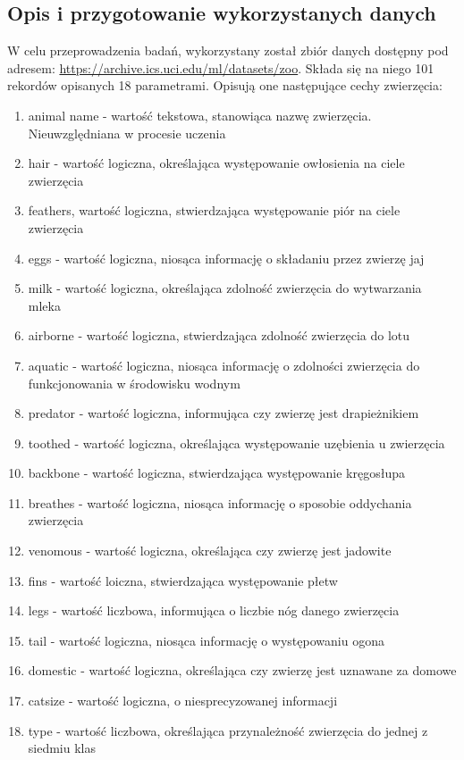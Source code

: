\documentclass[12pt,twoside]{article}
\begin{document}
\subsection{Opis i przygotowanie wykorzystanych danych}
W celu przeprowadzenia badań, wykorzystany został zbiór danych dostępny pod adresem: \url{https://archive.ics.uci.edu/ml/datasets/zoo}.
Składa się na niego 101 rekordów opisanych 18 parametrami. Opisują one następujące cechy zwierzęcia:
\begin{enumerate}
	\item animal name - wartość tekstowa, stanowiąca nazwę zwierzęcia. Nieuwzględniana w procesie uczenia
	\item hair - wartość logiczna, określająca występowanie owłosienia na ciele zwierzęcia
	\item feathers, wartość logiczna, stwierdzająca występowanie piór na ciele zwierzęcia
	\item eggs - wartość logiczna, niosąca informację o składaniu przez zwierzę jaj
	\item milk - wartość logiczna, określająca zdolność zwierzęcia do wytwarzania mleka
	\item airborne - wartość logiczna, stwierdzająca zdolność zwierzęcia do lotu
	\item aquatic - wartość logiczna, niosąca informację o zdolności zwierzęcia do funkcjonowania w środowisku wodnym
	\item predator - wartość logiczna, informująca czy zwierzę jest drapieżnikiem
	\item toothed - wartość logiczna, określająca występowanie uzębienia u zwierzęcia
	\item backbone - wartość logiczna, stwierdzająca występowanie kręgosłupa
	\item breathes - wartość logiczna, niosąca informację o sposobie oddychania zwierzęcia
	\item venomous - wartość logiczna, określająca czy zwierzę jest jadowite
	\item fins - wartość loiczna, stwierdzająca występowanie płetw
	\item legs - wartość liczbowa, informująca o liczbie nóg danego zwierzęcia
	\item tail - wartość logiczna, niosąca informację o występowaniu ogona
	\item domestic - wartość logiczna, określająca czy zwierzę jest uznawane za domowe
	\item catsize - wartość logiczna, o niesprecyzowanej informacji
	\item type - wartość liczbowa, określająca przynależność zwierzęcia do jednej z siedmiu klas
\end{enumerate}
\end{document}
